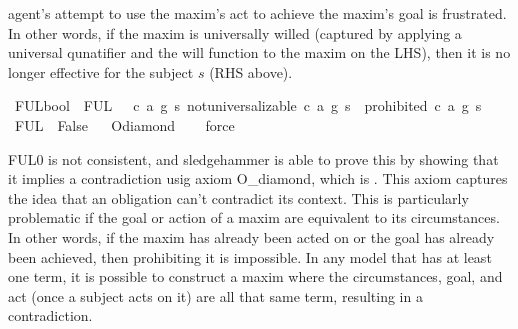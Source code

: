 \begin{isabellebody}
\begin{isamarkuptext}
agent's attempt to use the maxim's act to achieve the maxim's goal is frustrated. In other words, if 
the maxim is universally willed (captured by applying a universal qunatifier and the will function 
to the maxim on the LHS), then it is no longer effective for the subject $s$ (RHS above).%
\end{isamarkuptext}\isamarkuptrue%
\isamarkupfalse%
\ FUL{}{\isacharcolon}{\isacharcolon}bool\ \ {\isachardoublequoteopen}FUL{}\ {\isasymequiv}\ {\isasymforall}\ c\ a\ g\ s{\isachardot}\ not{\isacharunderscore}universalizable\ {\isacharparenleft}c{\isacharcomma}\ a{\isacharcomma}\ g{\isacharparenright}\ s\ {\isasymlongrightarrow}\ {\isasymTurnstile}{\isacharparenleft}{\isacharparenleft}prohibited\ {\isacharparenleft}c{\isacharcomma}\ a{\isacharcomma}\ g{\isacharparenright}\ s{\isacharparenright}{\isacharparenright}{\isachardoublequoteclose}\isanewline
%
\isanewline
\isanewline
{}\isamarkupfalse%
\ {\isachardoublequoteopen}FUL{}\ {\isasymlongrightarrow}\ False{\isachardoublequoteclose}%
\isadelimproof
\ %
\endisadelimproof
%
\isatagproof
{}\isamarkupfalse%
\ O{\isacharunderscore}diamond\isanewline
\ \ \isamarkupfalse%
\ force%
\endisatagproof
{\isafoldproof}%
%
\isadelimproof
%
\endisadelimproof
%
\begin{isamarkuptext}%
FUL0 is not consistent, and sledgehammer is able to prove this by showing that it implies a contradiction 
usig axiom O\_diamond, which is . This axiom captures 
the idea that an obligation can't contradict its context. This is particularly problematic if the goal or 
action of a maxim are equivalent to its circumstances. In other words, if the maxim has already been 
acted on or the goal has already been achieved, then prohibiting it is impossible. 
In any model that has at least one term, it is possible to construct a maxim where the circumstances, goal, 
and act (once a subject acts on it) are all that same term, resulting in a contradiction. 


\end{isamarkuptext}
\end{isabellebody}
